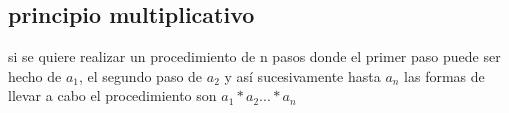 \subsection{principio multiplicativo}
si se quiere realizar un procedimiento de n pasos donde el primer paso puede ser hecho de $a_{1}$, el segundo paso
de $a_{2}$ y así sucesivamente hasta $a_{n}$ las formas de llevar a cabo el procedimiento son $a_{1}*a_{2} ... *a_{n}$

